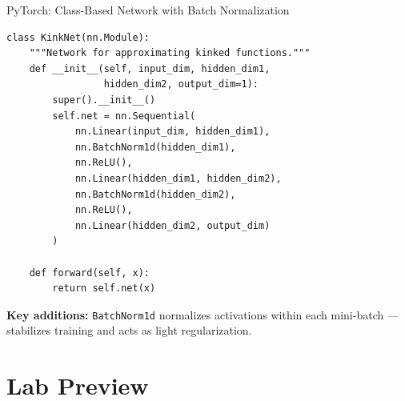 \documentclass[10pt,english,aspectratio=169]{beamer}
\begin{document}
\begin{frame}[fragile]{PyTorch: Class-Based Network with Batch Normalization}

\begin{lstlisting}[style=pythonstyle]
class KinkNet(nn.Module):
    """Network for approximating kinked functions."""
    def __init__(self, input_dim, hidden_dim1,
                 hidden_dim2, output_dim=1):
        super().__init__()
        self.net = nn.Sequential(
            nn.Linear(input_dim, hidden_dim1),
            nn.BatchNorm1d(hidden_dim1),
            nn.ReLU(),
            nn.Linear(hidden_dim1, hidden_dim2),
            nn.BatchNorm1d(hidden_dim2),
            nn.ReLU(),
            nn.Linear(hidden_dim2, output_dim)
        )

    def forward(self, x):
        return self.net(x)
\end{lstlisting}

\medskip
\textbf{Key additions:} \texttt{BatchNorm1d} normalizes activations within each mini-batch --- stabilizes training and acts as light regularization.
\end{frame}

\section{Lab Preview}
\end{document}
